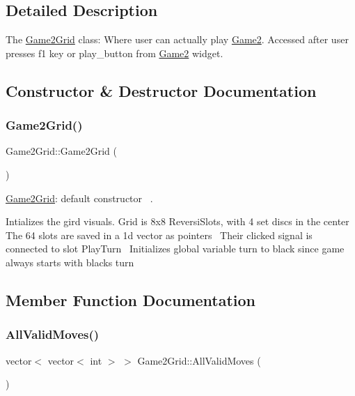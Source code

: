 \subsection{Detailed Description}
The \hyperlink{classGame2Grid}{Game2\+Grid} class\+: Where user can actually play \hyperlink{classGame2}{Game2}. Accessed after user presses f1 key or play\+\_\+button from \hyperlink{classGame2}{Game2} widget. 

\subsection{Constructor \& Destructor Documentation}
\mbox{\label{classGame2Grid_a4bf23814b061f4674560548f922033ff}} 
\subsubsection{\texorpdfstring{Game2\+Grid()}{Game2Grid()}}
{\footnotesize\ttfamily Game2\+Grid\+::\+Game2\+Grid (\begin{DoxyParamCaption}{ }\end{DoxyParamCaption})}



\hyperlink{classGame2Grid}{Game2\+Grid}\+: default constructor~\newline
. 

Intializes the gird visual\textquotesingle{}s. Grid is 8x8 Reversi\+Slots, with 4 set discs in the center~\newline
The 64 slots are saved in a 1d vector as pointers~\newline
Their clicked signal is connected to slot Play\+Turn~\newline
Initializes global variable turn to black since game always starts with black\textquotesingle{}s turn 

\subsection{Member Function Documentation}
\mbox{\label{classGame2Grid_aab66dd4b9d00c82f692cfaa6a8642815}} 
\subsubsection{\texorpdfstring{All\+Valid\+Moves()}{AllValidMoves()}}
{\footnotesize\ttfamily vector$<$ vector$<$ int $>$ $>$ Game2\+Grid\+::\+All\+Valid\+Moves (\begin{DoxyParamCaption}{ }\end{DoxyParamCaption})}



